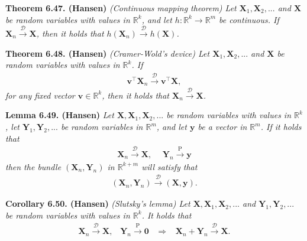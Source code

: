 \documentclass[a4paper,12pt,openany]{book}
\begin{document}
\textbf{Theorem 6.47. (Hansen)} \emph{(Continuous mapping theorem) Let \(\mathbf{X}_1,\mathbf{X}_2,...\) and \(\mathbf{X}\) be random variables with values in \(\mathbb{R}^k\), and let \(h : \mathbb{R}^k\to\mathbb{R}^m\) be continuous. If \(\mathbf{X}_n\stackrel{\mathcal{D}}{\to} \mathbf{X}\), then it holds that \(h(\mathbf{X}_n)\stackrel{\mathcal{D}}{\to} h(\mathbf{X})\).}

\textbf{Theorem 6.48. (Hansen)} \emph{(Cramer-Wold's device) Let \(\mathbf{X}_1,\mathbf{X}_2,...\) and \(\mathbf{X}\) be random variables with values in \(\mathbb{R}^k\). If}
\begin{align*}
    \mathbf{v}^\top\mathbf{X}_n\stackrel{\mathcal{D}}{\to} \mathbf{v}^\top\mathbf{X},\tag{6.51}
\end{align*}
\emph{for any fixed vector \(\mathbf{v}\in\mathbb{R}^k\), then it holds that \(\mathbf{X}_n\stackrel{\mathcal{D}}{\to} \mathbf{X}\).}

\textbf{Lemma 6.49. (Hansen)} \emph{Let \(\mathbf{X},\mathbf{X}_1,\mathbf{X}_2,...\) be random variables with values in \(\mathbb{R}^k\), let \(\mathbf{Y}_1,\mathbf{Y}_2,...\) be random variables in \(\mathbb{R}^m\), and let \(\mathbf{y}\) be a vector in \(\mathbb{R}^m\). If it holds that}
\begin{align*}
    \mathbf{X}_n\stackrel{\mathcal{D}}{\to} \mathbf{X},\hspace{15pt}\mathbf{Y}_n\stackrel{\text{P}}{\to} \mathbf{y}
\end{align*}
\emph{then the bundle \((\mathbf{X}_n,\mathbf{Y}_n)\) in \(\mathbb{R}^{k+m}\) will satisfy that}
\begin{align*}
    (\mathbf{X}_n,\mathbf{Y}_n)\stackrel{\mathcal{D}}{\to} (\mathbf{X},\mathbf{y}).
\end{align*}

\textbf{Corollary 6.50. (Hansen)} \emph{(Slutsky's lemma) Let \(\mathbf{X},\mathbf{X}_1,\mathbf{X}_2,...\) and \(\mathbf{Y}_1,\mathbf{Y}_2,...\) be random variables with values in \(\mathbb{R}^k\). It holds that}
\begin{align*}
    \mathbf{X}_n\stackrel{\mathcal{D}}{\to} \mathbf{X},\hspace{10pt}\mathbf{Y}_n\stackrel{\text{P}}{\to} \mathbf{0}\hspace{10pt}\Rightarrow\hspace{10pt} \mathbf{X}_n+\mathbf{Y}_n\stackrel{\mathcal{D}}{\to}\mathbf{X}.
\end{align*}
\end{document}

